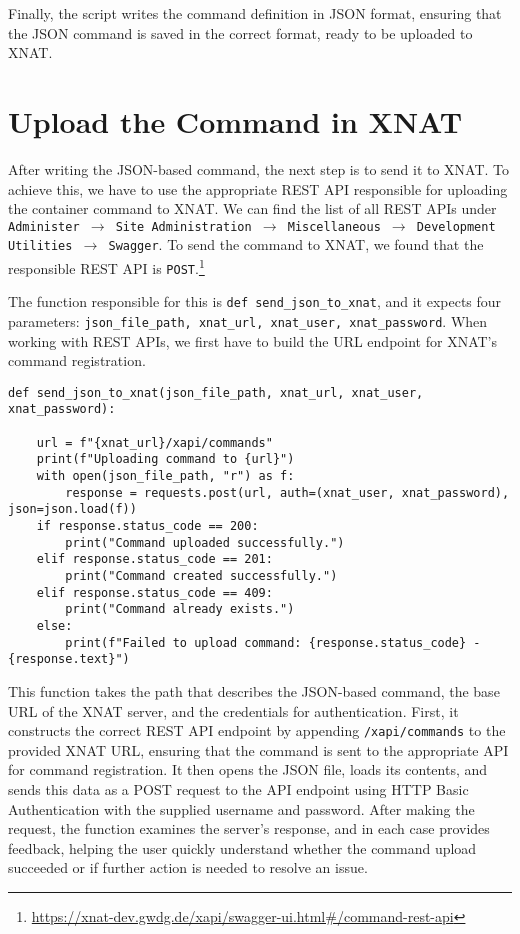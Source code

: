 Finally, the script writes the command definition in JSON format, ensuring that the JSON command is saved in the correct format, ready to be uploaded to XNAT.

\section{Upload the Command in XNAT}

After writing the JSON-based command, the next step is to send it to XNAT. To achieve this, we have to use the appropriate REST API responsible for uploading the container command to XNAT.
We can find the list of all REST APIs under \texttt{Administer $\rightarrow$ Site Administration $\rightarrow$ Miscellaneous $\rightarrow$ Development Utilities $\rightarrow$ Swagger}.
To send the command to XNAT, we found that the responsible REST API is \texttt{POST}.\footnote{\url{https://xnat-dev.gwdg.de/xapi/swagger-ui.html\#/command-rest-api}}

The function responsible for this is \texttt{def send\_json\_to\_xnat}, and it expects four parameters: \texttt{json\_file\_path, xnat\_url, xnat\_user, xnat\_password}. When working with REST APIs, we first have to build the URL endpoint for XNAT’s command registration.
 
\begin{lstlisting}
def send_json_to_xnat(json_file_path, xnat_url, xnat_user, xnat_password): 

    url = f"{xnat_url}/xapi/commands"
    print(f"Uploading command to {url}")
    with open(json_file_path, "r") as f:
        response = requests.post(url, auth=(xnat_user, xnat_password), json=json.load(f))
    if response.status_code == 200:
        print("Command uploaded successfully.")
    elif response.status_code == 201:
        print("Command created successfully.")
    elif response.status_code == 409:
        print("Command already exists.")
    else:
        print(f"Failed to upload command: {response.status_code} - {response.text}")
\end{lstlisting}

This function takes the path that describes the JSON-based command, the base URL of the XNAT server, and the credentials for authentication. First, it constructs the correct REST API endpoint by appending \texttt{/xapi/commands} to the provided XNAT URL, ensuring that the command is sent to the appropriate API for command registration. It then opens the JSON file, loads its contents, and sends this data as a POST request to the API endpoint using \ac{HTTP} Basic Authentication with the supplied username and password. After making the request, the function examines the server’s response, and in each case provides feedback, helping the user quickly understand whether the command upload succeeded or if further action is needed to resolve an issue.

